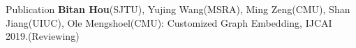 
\begin{rubric}{Publication}
		\textbf{Bitan Hou}(SJTU), Yujing Wang(MSRA), Ming Zeng(CMU), Shan Jiang(UIUC), Ole Mengshoel(CMU): Customized Graph Embedding, IJCAI 2019.(Reviewing)
\end{rubric}
